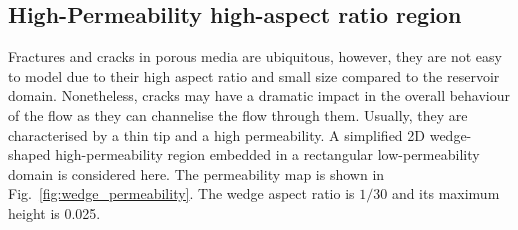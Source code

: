 \documentclass[preprint,authoryear,12pt]{elsarticle}
\begin{document}
\subsection{High-Permeability high-aspect ratio region}\label{res4}

Fractures and cracks in porous media are ubiquitous, however, they are
not easy to model due to their high aspect ratio and small size
compared to the reservoir domain. Nonetheless, cracks may have a
dramatic impact in the overall behaviour of the flow as they can
channelise the flow through them. Usually, they are characterised by a
thin tip and a high permeability. A simplified 2D wedge-shaped
high-permeability region embedded in a rectangular low-permeability
domain is considered here. The permeability map is shown in
Fig.~\ref{fig:wedge_permeability}. The wedge aspect ratio is $1/30$
and its maximum height is 0.025.
 
\end{document}
